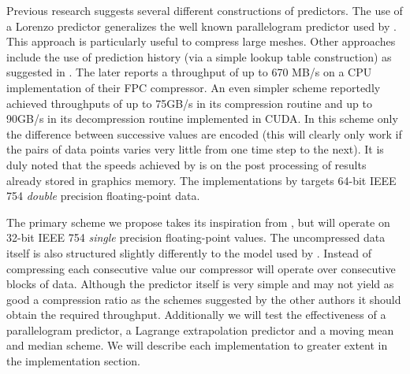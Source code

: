 \documentclass{acm_proc_article-sp}
\begin{document}
Previous research suggests several different constructions of predictors. The use of a Lorenzo predictor \cite{lindstrom2006fast} generalizes the well known parallelogram predictor used by \cite{engelson2000lossless}. This
approach is particularly useful to compress large meshes. Other approaches include the use of prediction history (via a simple lookup table construction) as suggested in \cite{1607248,4589203,4976448}. 
The later reports a throughput of up to 670 MB/s on a CPU implementation of their FPC compressor. An even simpler scheme \cite{O'Neil:2011:FDC:1964179.1964189} reportedly achieved throughputs of up to 75GB/s in its 
compression routine and up to 90GB/s in its decompression routine implemented in CUDA. In this scheme only the difference between successive values are encoded (this will clearly only work if the pairs of 
data points varies very little from one time step to the next). It is duly noted that the speeds achieved by \cite{O'Neil:2011:FDC:1964179.1964189} is on the post processing of results already stored in 
graphics memory. The implementations by \cite{O'Neil:2011:FDC:1964179.1964189,1607248,4589203,4976448,engelson2000lossless} targets 64-bit IEEE 754 \textit{double} precision floating-point data.

The primary scheme we propose takes its inspiration from \cite{O'Neil:2011:FDC:1964179.1964189}, but will operate on 32-bit IEEE 754 \textit{single} precision floating-point values. The uncompressed data itself 
is also structured slightly differently to the model used by \cite{O'Neil:2011:FDC:1964179.1964189}. Instead of compressing each consecutive value our compressor will operate over consecutive blocks of data. Although 
the predictor itself is very simple and may not yield as good a compression ratio as the schemes suggested by the other authors it should obtain the required throughput. Additionally we will test the effectiveness
of a parallelogram predictor, a Lagrange extrapolation predictor \cite{engelson2000lossless} and a moving mean and median scheme. We will describe each implementation to greater extent in the implementation section.
\end{document}
